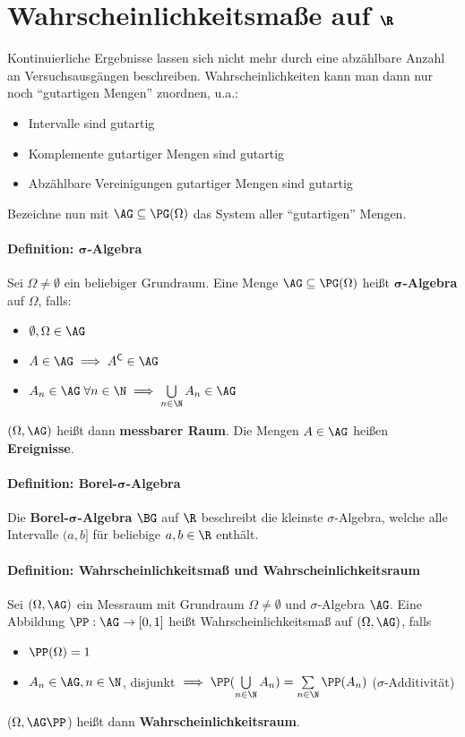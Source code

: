 \section{Wahrscheinlichkeitsmaße auf $\pmb{\R}$}
Kontinuierliche Ergebnisse lassen sich nicht mehr durch eine abzählbare Anzahl an Versuchsausgängen beschreiben.
Wahrscheinlichkeiten kann man dann nur noch \enquote{gutartigen Mengen} zuordnen, u.a.:
\begin{itemize}
	\item Intervalle sind gutartig
	\item Komplemente gutartiger Mengen sind gutartig
	\item Abzählbare Vereinigungen gutartiger Mengen sind gutartig
\end{itemize}
Bezeichne nun mit $\AG\subseteq\PG(\Omega)$ das System aller \enquote{gutartigen} Mengen.

\paragraph{Definition: $\pmb{\sigma}$-Algebra}
Sei $\Omega\neq\emptyset$ ein beliebiger Grundraum. Eine Menge $\AG\subseteq\PG(\Omega)$ heißt $\pmb{\sigma}$\textbf{-Algebra} auf $\Omega$, falls:
\begin{itemize}
	\item $\emptyset,\Omega\in\AG$
	\item $A\in\AG\implies A^{\mathsf{C}}\in\AG$
	\item $A_n\in\AG\;\forall n\in\N\implies\bigcup\limits_{n\in\N}A_n\in\AG$
\end{itemize}
$(\Omega,\AG)$ heißt dann \textbf{messbarer Raum}.
Die Mengen $A\in\AG$ heißen \textbf{Ereignisse}.

\paragraph{Definition: Borel-$\pmb{\sigma}$-Algebra}
Die \textbf{Borel-$\pmb{\sigma}$-Algebra} $\BG$ auf $\R$ beschreibt die kleinste $\sigma$-Algebra, welche alle Intervalle $(a,b]$ für beliebige $a,b\in\R$ enthält.

\paragraph{Definition: Wahrscheinlichkeitsmaß und Wahrscheinlichkeitsraum}
Sei $(\Omega,\AG)$ ein Messraum mit Grundraum $\Omega\neq\emptyset$ und $\sigma$-Algebra $\AG$.
Eine Abbildung $\PP:\AG\rightarrow[0,1]$ heißt Wahrscheinlichkeitsmaß auf $(\Omega,\AG)$, falls
\begin{itemize}
	\item $\PP(\Omega)=1$
	\item $A_n\in\AG,n\in\N$, disjunkt $\implies\PP(\bigcup\limits_{n\in\N}A_n)=\sum\limits_{n\in\N}\PP(A_n)$ \qquad($\sigma$-Additivität)
\end{itemize}
($\Omega,\AG\PP$) heißt dann \textbf{Wahrscheinlichkeitsraum}.


